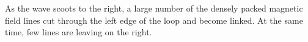 As the wave scoots to the right, a large number of the densely
packed magnetic field lines cut through the left edge of the loop
and become linked. At the same time, few lines are leaving
on the right.
